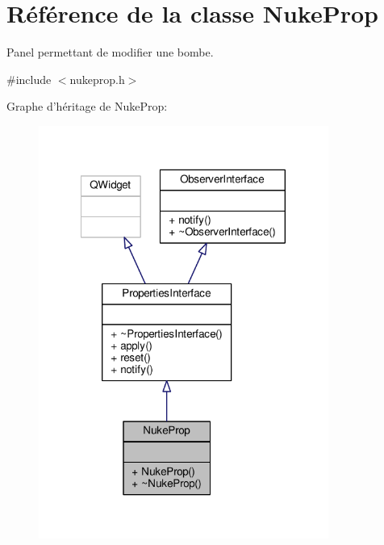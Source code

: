 \hypertarget{classNukeProp}{\section{Référence de la classe Nuke\+Prop}
\label{classNukeProp}
}


Panel permettant de modifier une bombe.  




{\ttfamily \#include $<$nukeprop.\+h$>$}



Graphe d'héritage de Nuke\+Prop\+:
\nopagebreak
\begin{figure}[H]
\begin{center}
\leavevmode
\includegraphics[width=269pt]{dc/d49/classNukeProp__inherit__graph}
\end{center}
\end{figure}


